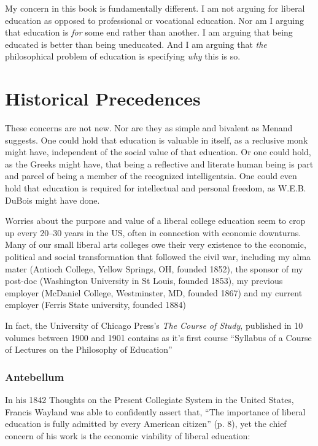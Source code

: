 My concern in this book is fundamentally different. I am not arguing for liberal education as opposed to professional or vocational education. Nor am I arguing that education is \emph{for} some end rather than another. I am arguing that being educated is better than being uneducated. And I am arguing that \emph{the} philosophical problem of education is specifying \emph{why} this is so.

\section{Historical Precedences}
\label{historicalprecedences}

These concerns are not new. Nor are they as simple and bivalent as Menand suggests. One could hold that education is valuable in itself, as a reclusive monk might have, independent of the social value of that education. Or one could hold, as the Greeks might have, that being a reflective and literate human being is part and parcel of being a member of the recognized intelligentsia. One could even hold that education is required for intellectual and personal freedom, as W.E.B. DuBois might have done.

Worries about the purpose and value of a liberal college education seem to crop up every 20--30 years in the US, often in connection with economic downturns. Many of our small liberal arts colleges owe their very existence to the economic, political and social transformation that followed the civil war, including my alma mater (Antioch College, Yellow Springs, OH, founded 1852), the sponsor of my post-doc (Washington University in St Louis, founded 1853), my previous employer (McDaniel College, Westminster, MD, founded 1867) and my current employer (Ferris State university, founded 1884)

In fact, the University of Chicago Press's \emph{The Course of Study}, published in 10 volumes between 1900 and 1901 contains as it's first course ``Syllabus of a Course of Lectures on the Philosophy of Education'' ~\citep{Parker:1900ig}

\subsubsection{Antebellum}
\label{antebellum}

In his 1842 Thoughts on the Present Collegiate System in the United States, Francis Wayland was able to confidently assert that, ``The importance of liberal education is fully admitted by every American citizen'' (p. 8), yet the chief concern of his work is the economic viability of liberal education:

